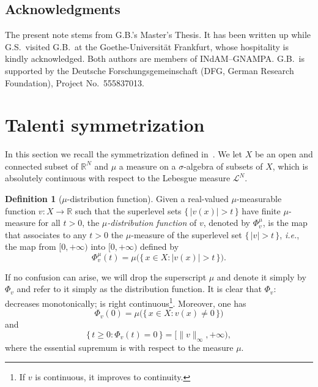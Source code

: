 \documentclass[a4paper,12pt,reqno]{amsart}
\numberwithin{equation}{section}
\newcommand{\R}{\mathbb{R}}
\theoremstyle{plain}
\theoremstyle{definition}
\newtheorem{definition}[theorem]{Definition}
\begin{document}
\subsection*{Acknowledgments} 

The present note stems from G.B.'s Master's Thesis. It has been written up while G.S.\ visited G.B.\ at the Goethe-Universität Frankfurt, whose hospitality is kindly acknowledged. Both authors are members of INdAM--GNAMPA. G.B.\ is supported by the Deutsche Forschungsgemeinschaft (DFG, German Research Foundation), Project No.~555837013.

\section{Talenti symmetrization}
\label{sec:symmetrization}

In this section we recall the symmetrization defined in~\cite{Tal97}. We let $X$ be an open and connected subset of $\mathbb{R}^N$ and $\mu$ a measure on a $\sigma$-algebra of subsets of $X$, which is absolutely continuous with respect to the Lebesgue measure $\mathcal{L}^N$.

\begin{definition}[$\mu$-distribution function]
%
Given a real-valued $\mu$-measurable function $v:X \to \R$ such that the superlevel sets $\{\,|v(x)|>t\,\}$ have finite $\mu$-measure for all $t>0$, the \emph{$\mu$-distribution function} of $v$, denoted by $\Phi_v^\mu$, is the map that associates to any $t>0$ the $\mu$-measure of the superlevel set $\{\,|v|>t\,\}$, \emph{i.e.}, the map from $[0,+\infty)$ into $[0,+\infty)$ defined by 
%
\begin{equation}
\label{eq:distribution-function}
\Phi^\mu_v(t)=\mu\bigl(\{\,x \in X:|v(x)|>t\,\}\bigr).
\end{equation}
%
\end{definition}

If no confusion can arise, we will drop the superscript $\mu$ and denote it simply by $\Phi_v$ and refer to it simply as the distribution function.
It is clear that $\Phi_v$: decreases monotonically; is right continuous\footnote{If $v$ is continuous, it improves to continuity.}. %
Moreover, one has
%
\[
\Phi_v(0)=\mu\bigl(\{\,x \in X:v(x)\neq0\,\}\bigr)
\]
%
and 
%
\[
\{\,t\geq0:\Phi_v(t)=0\,\}=[\|v\|_{\infty},+\infty),
\]
%
where the essential supremum is with respect to the measure $\mu$.
\end{document}
